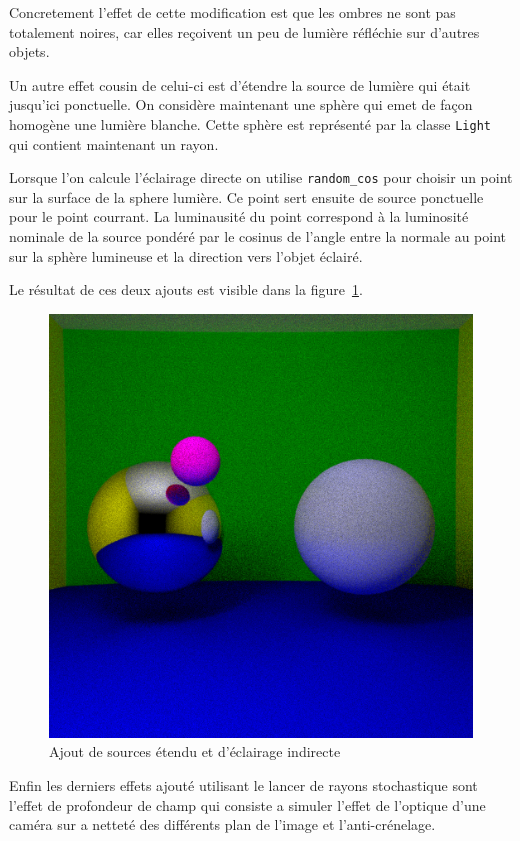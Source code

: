 \documentclass[12pt]{article}
\newcommand\id[1]{\texttt{#1}}
\begin{document}
Concretement l'effet de cette modification est que les ombres ne sont pas totalement noires, car elles reçoivent un peu de lumière réfléchie sur d'autres objets.

Un autre effet cousin de celui-ci est d'étendre la source de lumière qui était jusqu'ici ponctuelle.
On considère maintenant une sphère qui emet de façon homogène une lumière blanche.
Cette sphère est représenté par la classe \id{Light} qui contient maintenant un rayon.

Lorsque l'on calcule l'éclairage directe on utilise \id{random\_cos} pour choisir un point sur la surface de la sphere lumière. Ce point sert ensuite de source ponctuelle pour le point courrant.
La luminausité du point correspond à la luminosité nominale de la source pondéré par le cosinus de l'angle entre la normale au point sur la sphère lumineuse et la direction vers l'objet éclairé.

Le résultat de ces deux ajouts est visible dans la figure~\ref{fig:step7}.

\begin{figure}[ht]
  \centering
  \includegraphics[width=12cm]{../result/step7}
  \caption{Ajout de sources étendu et d'éclairage indirecte}\label{fig:step7}
\end{figure}

Enfin les derniers effets ajouté utilisant le lancer de rayons stochastique sont l'effet de profondeur de champ qui consiste a simuler l'effet de l'optique d'une caméra sur a netteté des différents plan de l'image et l'anti-crénelage.
\end{document}
